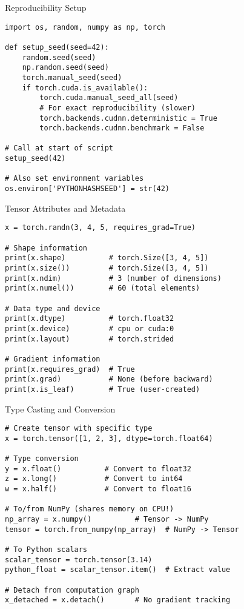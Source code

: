 \documentclass[aspectratio=169,10pt]{beamer}
\begin{document}
\begin{frame}[fragile]{Reproducibility Setup}
\begin{lstlisting}
import os, random, numpy as np, torch

def setup_seed(seed=42):
    random.seed(seed)
    np.random.seed(seed)
    torch.manual_seed(seed)
    if torch.cuda.is_available():
        torch.cuda.manual_seed_all(seed)
        # For exact reproducibility (slower)
        torch.backends.cudnn.deterministic = True
        torch.backends.cudnn.benchmark = False

# Call at start of script
setup_seed(42)

# Also set environment variables
os.environ['PYTHONHASHSEED'] = str(42)
\end{lstlisting}
\end{frame}

\begin{frame}[fragile]{Tensor Attributes and Metadata}
\begin{lstlisting}
x = torch.randn(3, 4, 5, requires_grad=True)

# Shape information
print(x.shape)          # torch.Size([3, 4, 5])
print(x.size())         # torch.Size([3, 4, 5])
print(x.ndim)           # 3 (number of dimensions)
print(x.numel())        # 60 (total elements)

# Data type and device
print(x.dtype)          # torch.float32
print(x.device)         # cpu or cuda:0
print(x.layout)         # torch.strided

# Gradient information
print(x.requires_grad)  # True
print(x.grad)           # None (before backward)
print(x.is_leaf)        # True (user-created)
\end{lstlisting}
\end{frame}

\begin{frame}[fragile]{Type Casting and Conversion}
\begin{lstlisting}
# Create tensor with specific type
x = torch.tensor([1, 2, 3], dtype=torch.float64)

# Type conversion
y = x.float()          # Convert to float32
z = x.long()           # Convert to int64
w = x.half()           # Convert to float16

# To/from NumPy (shares memory on CPU!)
np_array = x.numpy()          # Tensor -> NumPy
tensor = torch.from_numpy(np_array)  # NumPy -> Tensor

# To Python scalars
scalar_tensor = torch.tensor(3.14)
python_float = scalar_tensor.item()  # Extract value

# Detach from computation graph
x_detached = x.detach()       # No gradient tracking
\end{lstlisting}
\end{frame}
\end{document}
